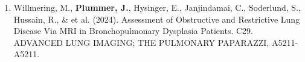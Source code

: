 \documentclass[12pt,]{scrartcl}
\begin{document}
\begin{enumerate}
  \leftskip-0.13in %









    \item Willmering, M., \textbf{Plummer, J.}, Hysinger, E., Janjindamai, C., Soderlund, S., Hussain, R., \& et al. (2024). Assessment of Obstructive and Restrictive Lung Disease Via MRI in Bronchopulmonary Dysplasia Patients. C29. ADVANCED LUNG IMAGING; THE PULMONARY PAPARAZZI, A5211-A5211.


\end{enumerate}
\end{document}
